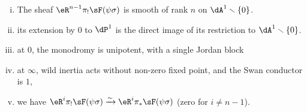 \begin{theorem_}\label{VI:7-8}
\begin{enumerate}[(i)]
  \item The sheaf $\eR^{n-1}\pi_! \sF(\psi\sigma)$ is smooth of rank $n$ on
    $\dA^1\setminus \{0\}$.
  \item its extension by $0$ to $\dP^1$ is the direct image of its
    restriction to $\dA^1\setminus \{0\}$.
  \item at $0$, the monodromy is unipotent, with a single Jordan block
  \item at $\infty$, wild inertia acts without non-zero fixed point, and the
    Swan conductor is $1$,
  \item we have $\eR^i \pi_! \sF(\psi\sigma) \iso \eR^i \pi_\ast \sF(\psi\sigma)$
    (zero for $i\ne n-1$).
\end{enumerate}
\end{theorem_}
